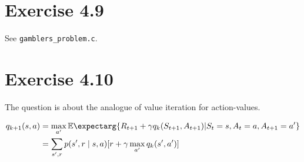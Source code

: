 \documentclass[a4paper, 12pt, titlepage]{article}
\newcommand{\expect}{\mathbb{E}\expectarg}
\begin{document}
\section{Exercise 4.9}

See \verb|gamblers_problem.c|.


\section{Exercise 4.10}

The question is about the analogue of value iteration for action-values.

\begin{align*}
        q_{k + 1}(s, a) &= \max_{a'} \expect{R_{t + 1} + \gamma q_k(S_{t + 1}, A_{t + 1}) | S_t = s, A_t = a, A_{t + 1} = a'}  \\
                        &= \sum_{s', r} p(s', r \mid s, a)[r + \gamma \max_{a'} q_k(s', a')]
\end{align*}
\end{document}
